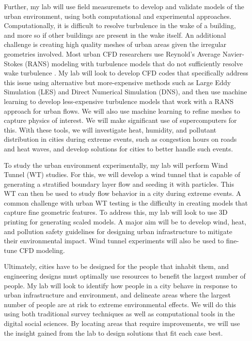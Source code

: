 \documentclass[12pt]{article}
\begin{document}
Further, my lab will use field measuremets to develop and validate models of the urban environment, using both computational and experimental approaches. Computationally, it is difficult to resolve turbulence in the wake of a building, and more so if other buildings are present in the wake itself. An additional challenge is creating high quality meshes of urban areas given the irregular geometries involved. Most urban CFD researchers use Reynold's Average Navier-Stokes (RANS) modeling with turbulence models that do not sufficiently resolve wake turbulence \cite{blocken2015computational}. My lab will look to develop CFD codes that specifically address this issue using alternative but more-expensive methods such as Large Eddy Simulation (LES) and Direct Numerical Simulation (DNS), and then use machine learning to develop less-expensive turbulence models that work with a RANS approach for urban flows. We will also use machine learning to refine meshes to capture physics of interest. We will make significant use of supercomputers for this. With these tools, we will investigate heat, humidity, and pollutant distribution in cities during extreme events, such as congestion hours on roads and heat waves, and develop solutions for cities to better handle such events.

To study the urban environment experimentally, my lab will perform Wind Tunnel (WT) studies. For this, we will develop a wind tunnel that is capable of generating a stratified boundary layer flow and seeding it with particles. This WT can then be used to study flow behavior in a city during extreme events. A common challenge with urban WT testing is the difficulty in creating models that capture fine geometric features. To address this, my lab will look to use 3D printing for generating scaled models. A major aim will be to develop wind, heat, and pollution safety guidelines for designing urban infrastructure to mitigate their environmental impact. Wind tunnel experiments will also be used to fine-tune CFD modeling. 

Ultimately, cities have to be designed for the people that inhabit them, and engineering designs must optimally use resources to benefit the largest number of people. My lab will look to identify how people in a city behave in response to urban infrastructure and environment, and delineate areas where the largest number of people are at risk to extreme environmental effects. We will do this using both traditional survey techniques as well as computational tools in the digital social sciences. By locating areas that require improvements, we will use the insight gained from the lab to design solutions that fit each case best. 
\end{document}
